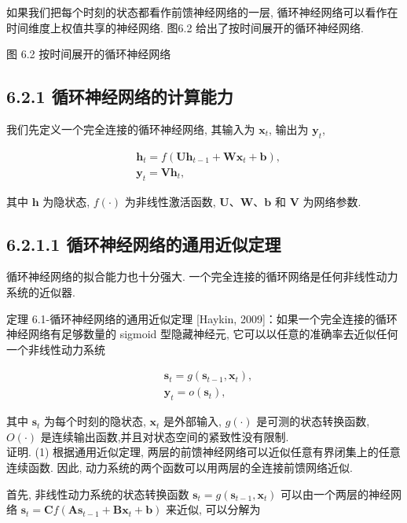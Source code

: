 \documentclass[10pt]{article}
\begin{document}
如果我们把每个时刻的状态都看作前馈神经网络的一层, 循环神经网络可以看作在时间维度上权值共享的神经网络. 图6.2 给出了按时间展开的循环神经网络.



图 6.2 按时间展开的循环神经网络

\subsection*{6.2.1 循环神经网络的计算能力}
我们先定义一个完全连接的循环神经网络, 其输入为 $\boldsymbol{x}_{t}$, 输出为 $\boldsymbol{y}_{t}$,


\begin{align*}
& \boldsymbol{h}_{t}=f\left(\boldsymbol{U} \boldsymbol{h}_{t-1}+\boldsymbol{W} \boldsymbol{x}_{t}+\boldsymbol{b}\right),  \tag{6.8}\\
& \boldsymbol{y}_{t}=\boldsymbol{V} \boldsymbol{h}_{t}, \tag{6.9}
\end{align*}


其中 $\boldsymbol{h}$ 为隐状态, $f(\cdot)$ 为非线性激活函数, $\boldsymbol{U} 、 \boldsymbol{W} 、 \boldsymbol{b}$ 和 $\boldsymbol{V}$ 为网络参数.

\subsection*{6.2.1.1 循环神经网络的通用近似定理}
循环神经网络的拟合能力也十分强大. 一个完全连接的循环网络是任何非线性动力系统的近似器.

定理 6.1-循环神经网络的通用近似定理 [Haykin, 2009]：如果一个完全连接的循环神经网络有足够数量的 sigmoid 型隐藏神经元, 它可以以任意的准确率去近似任何一个非线性动力系统


\begin{align*}
& \boldsymbol{s}_{t}=g\left(\boldsymbol{s}_{t-1}, \boldsymbol{x}_{t}\right),  \tag{6.10}\\
& \boldsymbol{y}_{t}=o\left(\boldsymbol{s}_{t}\right), \tag{6.11}
\end{align*}


其中 $\boldsymbol{s}_{t}$ 为每个时刻的隐状态, $\boldsymbol{x}_{t}$ 是外部输入, $g(\cdot)$ 是可测的状态转换函数, $O(\cdot)$ 是连续输出函数,并且对状态空间的紧致性没有限制.\\
证明. (1) 根据通用近似定理, 两层的前馈神经网络可以近似任意有界闭集上的任意连续函数. 因此, 动力系统的两个函数可以用两层的全连接前馈网络近似.

首先, 非线性动力系统的状态转换函数 $\boldsymbol{s}_{t}=g\left(\boldsymbol{s}_{t-1}, \boldsymbol{x}_{t}\right)$ 可以由一个两层的神经网络 $\boldsymbol{s}_{t}=\boldsymbol{C} f\left(\boldsymbol{A} \boldsymbol{s}_{t-1}+\boldsymbol{B} \boldsymbol{x}_{t}+\boldsymbol{b}\right)$ 来近似, 可以分解为
\end{document}
